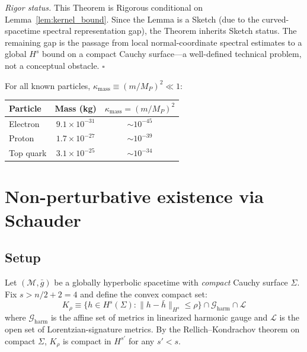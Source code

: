 \documentclass[12pt,a4paper]{article}
\begin{document}
\smallskip\noindent\textit{Rigor status.} This Theorem is Rigorous conditional on
Lemma~\ref{lem:kernel_bound}. Since the Lemma is a Sketch (due to the curved-spacetime
spectral representation gap), the Theorem inherits Sketch status. The
remaining gap is the passage from local normal-coordinate spectral estimates to a global
$H^s$ bound on a compact Cauchy surface---a well-defined technical problem, not a
conceptual obstacle. \hfill$\square$

\medskip

For all known particles, $\kappa_{\text{mass}} \equiv (m/M_P)^2 \ll 1$:
\begin{center}
\begin{tabular}{lcc}
\toprule
Particle & Mass (kg) & $\kappa_{\text{mass}} = (m/M_P)^2$ \\
\midrule
Electron & $9.1\times10^{-31}$ & $\sim 10^{-45}$ \\
Proton & $1.7\times10^{-27}$ & $\sim 10^{-39}$ \\
Top quark & $3.1\times10^{-25}$ & $\sim 10^{-34}$ \\
\bottomrule
\end{tabular}
\end{center}

\section{Non-perturbative existence via Schauder}
\label{sec:schauder}

\subsection{Setup}

Let $(\mathcal{M},\bar{g})$ be a globally hyperbolic spacetime with \emph{compact} Cauchy
surface $\Sigma$. Fix $s > n/2 + 2 = 4$ and define the convex compact set:
\begin{equation}
K_\rho \equiv \bigl\{h \in H^s(\Sigma) : \|h-\bar{h}\|_{H^s} \leq \rho\bigr\}
\cap \mathcal{G}_{\text{harm}} \cap \mathcal{L}
\label{eq:K_rho}
\end{equation}
where $\mathcal{G}_{\text{harm}}$ is the affine set of metrics in linearized harmonic
gauge and $\mathcal{L}$ is the open set of Lorentzian-signature metrics. By the
Rellich--Kondrachov theorem on compact $\Sigma$, $K_\rho$ is compact in $H^{s'}$ for
any $s' < s$.
\end{document}
